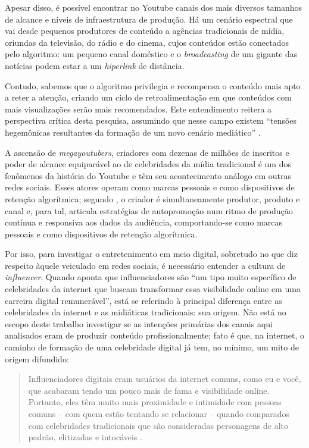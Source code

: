 \documentclass[portuguese]{textolivre}
\begin{document}
Apesar disso, é possível encontrar no Youtube canais dos mais diversos tamanhos de alcance e níveis de infraestrutura de produção. Há um cenário espectral que vai desde pequenos produtores de conteúdo a agências tradicionais de mídia, oriundas da televisão, do rádio e do cinema, cujos conteúdos estão conectados pelo algoritmo: um pequeno canal doméstico e o \textit{broadcasting} de um gigante das notícias podem estar a um \textit{hiperlink} de distância.

Contudo, sabemos que o algoritmo privilegia e recompensa o conteúdo mais apto a reter a atenção, criando um ciclo de retroalimentação em que conteúdos com mais visualizações serão mais recomendados. Este entendimento reitera a perspectiva crítica desta pesquisa, assumindo que nesse campo existem “tensões hegemônicas resultantes da formação de um novo cenário mediático” \cite[p. 54]{Kim2012InstitutionalizationYouTube}.

A ascensão de \textit{megayoutubers}, criadores com dezenas de milhões de inscritos e poder de alcance equiparável ao de celebridades da mídia tradicional é um dos fenômenos da história do Youtube e têm seu acontecimento análogo em outras redes sociais. Esses atores operam como marcas pessoais e como dispositivos de retenção algorítmica; segundo \textcite{CunninghamCraig2019SocialMediaEntertainment}, o criador é simultaneamente produtor, produto e canal e, para tal, articula estratégias de autopromoção num ritmo de produção contínua e responsiva aos dados da audiência, comportando-se como marcas pessoais e como dispositivos de retenção algorítmica.

Por isso, para investigar o entretenimento em meio digital, sobretudo no que diz respeito àquele veiculado em redes sociais, é necessário entender a cultura de \textit{influencer}. Quando \textcite[p. 290]{Abidin2021Influencers} aponta que influenciadores são “um tipo muito específico de celebridades da internet que buscam transformar essa visibilidade online em uma carreira digital remunerável”, está se referindo à principal diferença entre as celebridades da internet e as midiáticas tradicionais: sua origem. Não está no escopo deste trabalho investigar se as intenções primárias dos canais aqui analisados eram de produzir conteúdo profissionalmente; fato é que, na internet, o caminho de formação de uma celebridade digital já tem, no mínimo, um mito de origem difundido:

\begin{quote}
    Influenciadores digitais eram usuários da internet comuns, como eu e você, que acabaram tendo um pouco mais de fama e visibilidade online. Portanto, eles têm muito mais proximidade e intimidade com pessoas comuns – com quem estão tentando se relacionar – quando comparados com celebridades tradicionais que são consideradas personagens de alto padrão, elitizadas e intocáveis \cite[p. 292]{Abidin2021Influencers}.
\end{quote}
\end{document}
